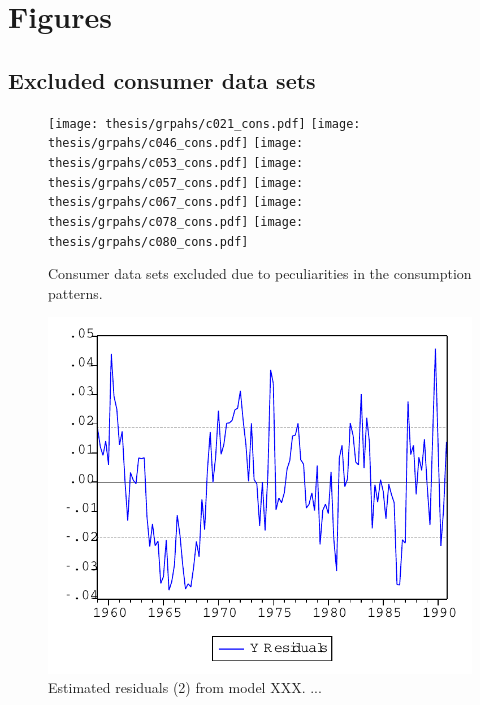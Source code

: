 
\section{Figures}\label{App:Figures}

\subsection{Excluded consumer data sets}\label{App:Figures;Excluded}

\begin{figure}[ht]
    \begin{center}
        \texttt{[image: thesis/grpahs/c021\_cons.pdf]}
        \texttt{[image: thesis/grpahs/c046\_cons.pdf]}
        \texttt{[image: thesis/grpahs/c053\_cons.pdf]}
        \texttt{[image: thesis/grpahs/c057\_cons.pdf]}
        \texttt{[image: thesis/grpahs/c067\_cons.pdf]}
        \texttt{[image: thesis/grpahs/c078\_cons.pdf]}
        \texttt{[image: thesis/grpahs/c080\_cons.pdf]}
        \caption[Consumer data sets excluded due to peculiarities in the consumption patterns]{Consumer data sets excluded due to peculiarities in the consumption patterns. \quantnet}
        \label{Fig:Resids2}
    \end{center}
\end{figure}



\begin{figure}[ht]
    \begin{center}
        \includegraphics[scale=0.5,angle=0]{thesis/figures/graph.pdf}
        \caption{Estimated residuals (2) from model XXX. ...}
        \label{Fig:Resids2}
    \end{center}
\end{figure}
